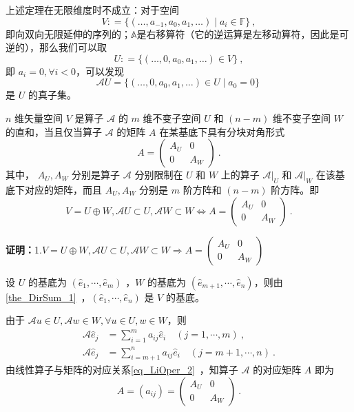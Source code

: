 \begin{example}{}
上述定理在无限维度时不成立：对于空间
$$
V: = \{ (\dots, a_{-1}, a_0, a_1, \dots) \mid a_i \in \mathbb{F}\}~,
$$
即向双向无限延伸的序列的；$\mathbb{A}$是右移算符（它的逆运算是左移动算符，因此是可逆的），那么我们可以取
$$
U: = \{ (\dots, 0, a_0, a_1, \dots) \in V \}~,
$$
即 $a_i = 0, \forall i < 0$，可以发现
$$
\mathcal{A} U = \{ (\dots, 0, a_0, a_1, \dots) \in U \mid a_0 = 0 \}~
$$
是 $U$ 的真子集。
\end{example}


\begin{theorem}{}\label{the_InvSP_1}
$n$ 维矢量空间 $V$ 是算子 $\mathcal{A}$ 的 $m$ 维不变子空间 $U$ 和 $(n-m)$ 维不变子空间 $W$ 的直和，当且仅当算子 $\mathcal{A}$ 的矩阵 $A$ 在某基底下具有分块对角形式
\begin{equation}\label{eq_InvSP_1}
A=\begin{pmatrix}
A_U&0\\
0&A_W
\end{pmatrix}~.
\end{equation}
其中， $A_U,A_W$ 分别是算子 $\mathcal{A}$ 分别限制在 $U$ 和 $W$ 上的算子 $\mathcal{A}|_U$ 和 $\mathcal{A}|_W$ 在该基底下对应的矩阵，而且 $A_U,A_W$ 分别是 $m$ 阶方阵和 $(n-m)$ 阶方阵。即
\begin{equation}
V=U\oplus W,\mathcal{A}U\subset U,\mathcal{A}W\subset W\Leftrightarrow A=\begin{pmatrix}
A_U&0\\
0&A_W
\end{pmatrix}~.
\end{equation}

\end{theorem}

\textbf{证明：}1.$
V=U\oplus W,\mathcal{A}U\subset U,\mathcal{A}W\subset W\Rightarrow A=\begin{pmatrix}
A_U&0\\
0&A_W
\end{pmatrix}
$

设 $U$ 的基底为 $(\hat e_1,\cdots,\hat e_m)$ ，$W$ 的基底为 $(\hat e_{m+1},\cdots,\hat e_n)$，则由\autoref{the_DirSum_1}~，$(\hat e_{1},\cdots,\hat e_n)$ 是 $V$ 的基底。

由于 $\mathcal{A}u\in U, \mathcal{A} w\in W,\forall  u\in U, w\in W$，则
\begin{equation}\label{eq_InvSP_2}
\begin{aligned}
\mathcal{A}\hat e_j&=\sum_{i=1}^m a_{ij}\hat e_i\quad (j=1,\cdots ,m)~,\\
\mathcal{A}\hat e_j&=\sum_{i=m+1}^n a_{ij}\hat e_i\quad (j=m+1,\cdots ,n)~.
\end{aligned}
\end{equation}
由线性算子与矩阵的对应关系\autoref{eq_LiOper_2}~，知算子 $\mathcal{A}$ 的对应矩阵 $A$ 即为 
\begin{equation}
A=(a_{ij})=\begin{pmatrix}
A_U&0\\
0&A_W
\end{pmatrix}~.
\end{equation}


